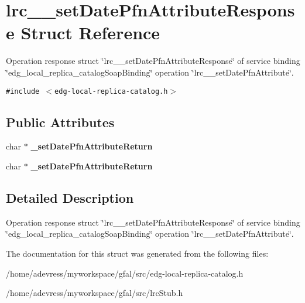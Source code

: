 \section{lrc\_\-\_\-set\-Date\-Pfn\-Attribute\-Response Struct Reference}
\label{structlrc____setDatePfnAttributeResponse}
Operation response struct \char`\"{}lrc\_\-\_\-set\-Date\-Pfn\-Attribute\-Response\char`\"{} of service binding \char`\"{}edg\_\-local\_\-replica\_\-catalog\-Soap\-Binding\char`\"{} operation \char`\"{}lrc\_\-\_\-set\-Date\-Pfn\-Attribute\char`\"{}.  


{\tt \#include $<$edg-local-replica-catalog.h$>$}

\subsection*{Public Attributes}
\begin{CompactItemize}
\item 
char $\ast$ \textbf{\_\-set\-Date\-Pfn\-Attribute\-Return}\label{structlrc____setDatePfnAttributeResponse_d5c3fc9187ad8a53a7575b102bde1c6c}

\item 
char $\ast$ \textbf{\_\-set\-Date\-Pfn\-Attribute\-Return}\label{structlrc____setDatePfnAttributeResponse_d5c3fc9187ad8a53a7575b102bde1c6c}

\end{CompactItemize}


\subsection{Detailed Description}
Operation response struct \char`\"{}lrc\_\-\_\-set\-Date\-Pfn\-Attribute\-Response\char`\"{} of service binding \char`\"{}edg\_\-local\_\-replica\_\-catalog\-Soap\-Binding\char`\"{} operation \char`\"{}lrc\_\-\_\-set\-Date\-Pfn\-Attribute\char`\"{}. 



The documentation for this struct was generated from the following files:\begin{CompactItemize}
\item 
/home/adevress/myworkspace/gfal/src/edg-local-replica-catalog.h\item 
/home/adevress/myworkspace/gfal/src/lrc\-Stub.h\end{CompactItemize}
